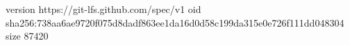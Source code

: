 version https://git-lfs.github.com/spec/v1
oid sha256:738aa6ae9720f075d8dadf863ee1da16d0d58c199da315e0e726f111dd048304
size 87420
